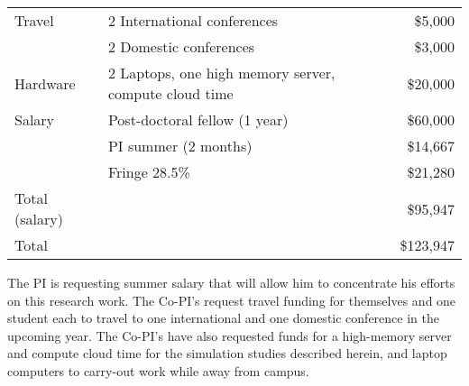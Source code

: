 \begin{center}
\begin{tabular}{llr}
\hline
\hline
Travel & 2 International conferences	&	  \$5,000 \\
&2 Domestic conferences	&	 \$3,000\\
\hline
Hardware &2 Laptops, one high memory server, compute cloud time		&	\$20,000\\
\hline
Salary & Post-doctoral fellow  (1 year)		&	\$60,000\\
& PI summer (2 months)	&\$14,667\\
& Fringe  28.5\%	&	\$21,280\\
\hline
	Total (salary)	&&	\$95,947\\
\hline
\hline
	Total	   &&         \$123,947\\
\end{tabular}
\end{center}

\vspace{.2cm} 

The PI is  requesting summer salary that will allow him to concentrate his efforts on this research work.  The Co-PI's request travel funding for themselves and one student each to travel to one international and one domestic conference in the upcoming year.  The Co-PI's have also requested funds for a high-memory server and compute cloud time for the simulation studies described herein, and laptop computers to carry-out work while away from campus.